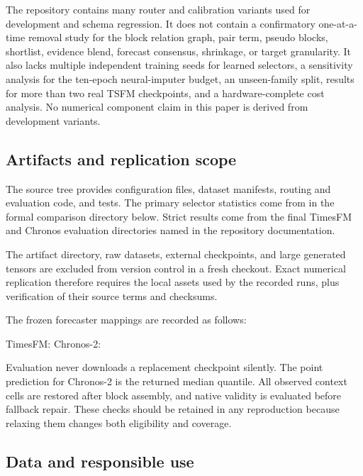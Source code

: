 The repository contains many router and calibration variants used for development and schema regression. It does not contain a confirmatory one-at-a-time removal study for the block relation graph, pair term, pseudo blocks, shortlist, evidence blend, forecast consensus, shrinkage, or target granularity. It also lacks multiple independent training seeds for learned selectors, a sensitivity analysis for the ten-epoch neural-imputer budget, an unseen-family split, results for more than two real TSFM checkpoints, and a hardware-complete cost analysis. No numerical component claim in this paper is derived from development variants.

\subsection{Artifacts and replication scope}

The source tree provides configuration files, dataset manifests, routing and evaluation code, and tests. The primary selector statistics come from  in the formal comparison directory below. Strict results come from the final TimesFM and Chronos evaluation directories named in the repository documentation.
\begin{center}
\small{}
\end{center}
The artifact directory, raw datasets, external checkpoints, and large generated tensors are excluded from version control in a fresh checkout. Exact numerical replication therefore requires the local assets used by the recorded runs, plus verification of their source terms and checksums.

The frozen forecaster mappings are recorded as follows:
\begin{center}
\small TimesFM: \qquad
Chronos-2: 
\end{center}
Evaluation never downloads a replacement checkpoint silently. The point prediction for Chronos-2 is the returned median quantile. All observed context cells are restored after block assembly, and native validity is evaluated before fallback repair. These checks should be retained in any reproduction because relaxing them changes both eligibility and coverage.

\subsection{Data and responsible use}

